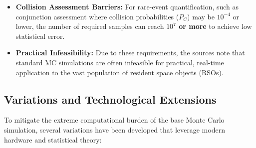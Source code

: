 \documentclass[
  letterpaper,
  DIV=11,
  numbers=noendperiod,
  oneside]{scrartcl}
\begin{document}
\begin{itemize}
\item
  \textbf{Collision Assessment Barriers:} For rare-event quantification,
  such as conjunction assessment where collision probabilities (\(P_C\))
  may be \(10^{-4}\) or lower, the number of required samples can reach
  \textbf{\(10^7\) or more} to achieve low statistical error.
\item
  \textbf{Practical Infeasibility:} Due to these requirements, the
  sources note that standard MC simulations are often infeasible for
  practical, real-time application to the vast population of resident
  space objects (RSOs).
\end{itemize}

\subsection{Variations and Technological
Extensions}\label{variations-and-technological-extensions}

To mitigate the extreme computational burden of the base Monte Carlo
simulation, several variations have been developed that leverage modern
hardware and statistical theory:
\end{document}
